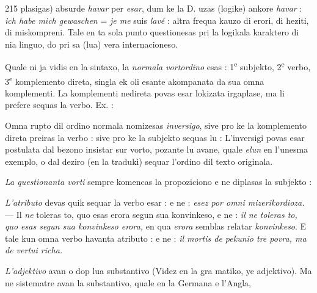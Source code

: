 \begin{VUpage}[219]{215}
\VUcontinue
plasigas) absurde \textit{havar} per \textit{esar}, dum ke la D. uzas (logike)\nl
ankore \textit{havar} : \textit{ich habe mich gewaschen} = \textit{je me} suis \textit{lavé} :\nl
altra frequa kauzo di erori, di heziti, di miskompreni. Tale\nl
en ta sola punto questionesas pri la logikala karaktero di\nl
nia linguo, do pri sa (lua) vera internacioneso.

\VUsaut{4.61mm}
\VUfilet{7.7mm}
\VUsaut{3.20mm}
\VUsaut{2.39mm}
\VUsaut{4.02mm}

Quale ni ja vidis en la sintaxo, la \textit{normala vortordino}\nl
esas : 1\textsuperscript{e} subjekto, 2\textsuperscript{e} verbo, 3\textsuperscript{e} komplemento direta, singla\nl
ek oli esante akompanata da sua omna komplementi. La\nl
komplementi nedireta povas esar lokizata irgaplase, ma li\nl
prefere sequas la verbo. Ex. : \nl
{}\cc
{}

Omna rupto dil ordino normala nomizesas \textit{inversigo}, sive\nl
pro ke la komplemento direta preiras la verbo : \nl
{} sive pro ke la subjekto sequas lu : \nl
{} L'inversigi povas esar postulata dal\nl
bezono insistar sur vorto, pozante lu avane, quale \textit{elun} en\nl
l'unesma exemplo, o dal deziro (en la traduki) sequar\nl
l'ordino dil texto originala.

\textit{La questionanta vorti} sempre komencas la propoziciono e\nl
ne diplasas la subjekto : \nl
{}\nl
{}

\textit{L'atributo} devas quik sequar la verbo esar : \cc
{} e ne : \textit{esez por omni mizerikordioza.} --- Il \textit{ne}\nl
toleras to, quo esas erora segun sua konvinkeso, e ne : \textit{il ne}\nl
\textit{toleras to, quo esas segun sua konvinkeso erora,} en qua \textit{erora}\nl
semblas relatar \textit{konvinkeso}. E tale kun omna verbo havanta\nl
atributo : \nl
e ne : \textit{il mortis de pekunio tre povra, ma de vertui richa.}

\textit{L'adjektivo} avan o dop lua substantivo (Videz en la gra\cc
matiko, ye adjektivo). Ma ne sistematre avan la substantivo,\nl
quale en la Germana e l'Angla,\nl
\end{VUpage}

